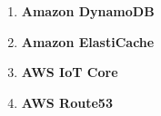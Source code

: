 \documentclass{article}
\begin{document}
\begin{enumerate}
    \item \textbf{Amazon DynamoDB} \cite{dynamo}
    \item \textbf{Amazon ElastiCache} \cite{elcache}
    \item \textbf{AWS IoT Core} \cite{iot}
    \item \textbf{AWS Route53} \cite{route53}

\end{enumerate}
\end{document}
